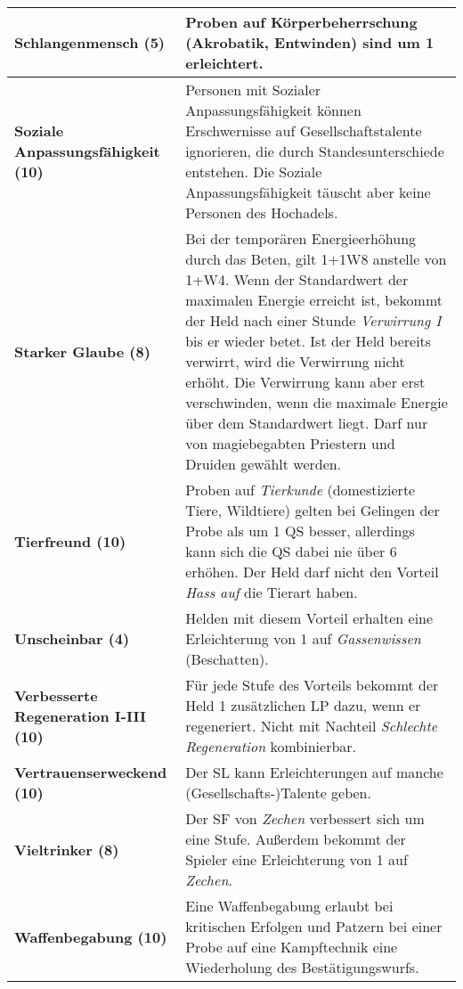 \begin{longtable}{|p{5cm}|p{11cm}|}
\textbf{Schlangenmensch (5)} & Proben auf Körperbeherrschung (Akrobatik, Entwinden) sind um 1 erleichtert. \\ \hline

\textbf{Soziale Anpassungsfähigkeit (10)} & Personen mit Sozialer Anpassungsfähigkeit können Erschwernisse auf Gesellschaftstalente ignorieren, die durch Standesunterschiede entstehen. Die Soziale Anpassungsfähigkeit täuscht aber keine Personen des Hochadels. \\ \hline

\textbf{Starker Glaube (8)} & Bei der temporären Energieerhöhung durch das Beten, gilt 1+1W8 anstelle von 1+W4. Wenn der Standardwert der maximalen Energie erreicht ist, bekommt der Held nach einer Stunde \textit{Verwirrung I} bis er wieder betet. Ist der Held bereits verwirrt, wird die Verwirrung nicht erhöht. Die Verwirrung kann aber erst verschwinden, wenn die maximale Energie über dem Standardwert liegt. Darf nur von magiebegabten Priestern und Druiden gewählt werden. \\ \hline

\textbf{Tierfreund (10)} & Proben auf \textit{Tierkunde} (domestizierte Tiere, Wildtiere) gelten bei Gelingen der Probe als um 1 QS besser, allerdings kann sich die QS dabei nie über 6 erhöhen. Der Held darf nicht den Vorteil \textit{Hass auf} die Tierart haben. \\ \hline

\textbf{Unscheinbar (4)} & Helden mit diesem Vorteil erhalten eine Erleichterung von 1 auf \textit{Gassenwissen} (Beschatten). \\ \hline

\textbf{Verbesserte Regeneration I-III (10)} & Für jede Stufe des Vorteils bekommt der Held 1 zusätzlichen LP dazu, wenn er regeneriert. Nicht mit Nachteil \textit{Schlechte Regeneration} kombinierbar. \\ \hline

\textbf{Vertrauenserweckend (10)} & Der SL kann Erleichterungen auf manche (Gesellschafts-)Talente geben. \\ \hline

\textbf{Vieltrinker (8)} & Der SF von \textit{Zechen} verbessert sich um eine Stufe. Außerdem bekommt der Spieler eine Erleichterung von 1 auf \textit{Zechen}. \\ \hline

\textbf{Waffenbegabung (10)} & Eine Waffenbegabung erlaubt bei kritischen Erfolgen und Patzern bei einer Probe auf eine Kampftechnik eine Wiederholung des Bestätigungswurfs. \\ \hline


\end{longtable}

